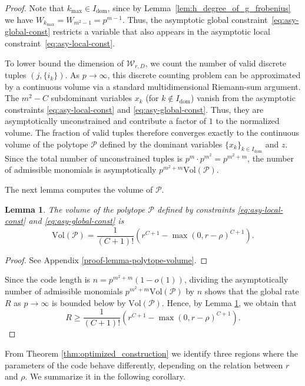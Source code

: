 \documentclass[11pt]{article}
\theoremstyle{plain}
\newtheorem{lemma}[theorem]{Lemma}
\theoremstyle{definition}
\begin{document}
\begin{proof}
Note that $k_{\max}\in I_{\mathrm{dom}}$, since by Lemma~\ref{lem:h_degree_of_g_frobenius} we have
$W_{k_{\max}}=W_{m^2-1}=p^{m-1}$.
Thus, the asymptotic global constraint~\eqref{eq:asy-global-const} restricts a variable that also appears in the asymptotic local constraint~\eqref{eq:asy-local-const}.



To lower bound the dimension of $\mathcal{W}_{r,D}$, we count the number of valid discrete tuples $(j, \{i_k\})$. As $p \to \infty$, this discrete counting problem can be approximated by a continuous volume via a standard multidimensional Riemann-sum argument.
The $m^2-C$ subdominant variables $x_k$ (for $k \notin I_{\mathrm{dom}}$) vanish from the asymptotic constraints \eqref{eq:asy-local-const} and \eqref{eq:asy-global-const}. Thus, they are asymptotically unconstrained and contribute a factor of $1$ to the normalized volume.
The fraction of valid tuples therefore converges exactly to the continuous volume of the polytope $\mathcal{P}$ defined by the dominant variables $\{x_k\}_{k\in I_{\mathrm{dom}}}$ and $z$.
Since the total number of unconstrained tuples is $p^m \cdot p^{m^2} = p^{m^2+m}$, the number of admissible monomials is asymptotically $p^{m^2+m} \mathrm{Vol}(\mathcal{P})$.
 
The next lemma computes the volume of $\mathcal{P}$.

\begin{lemma}
\label{lem:polytope_volume}
The volume of the polytope $\mathcal{P}$ defined by constraints \eqref{eq:asy-local-const} and \eqref{eq:asy-global-const} is
$$ \text{Vol}(\mathcal{P}) = \frac{1}{(C+1)!} \left(r^{C+1} - \max(0, r-\rho)^{C+1}\right). $$
\end{lemma}

\begin{proof}
    See Appendix \ref{proof-lemma-polytope-volume}.
\end{proof}
Since the code length is $n = p^{m^2+m}(1-o(1))$, dividing the asymptotically number of admissible monomials  $p^{m^2+m}\mathrm{Vol}(\mathcal{P})$ by $n$ shows that the global rate $R$ as $p \to \infty$ is bounded below by $\mathrm{Vol}(\mathcal{P})$. Hence, by Lemma \ref{lem:polytope_volume}, we obtain that
\[
R \ge \frac{1}{(C+1)!} \left(r^{C+1} - \max(0, r-\rho)^{C+1}\right). 
\]
\end{proof}

From Theorem \ref{thm:optimized_construction} we identify three regions where the parameters of the code behave differently, depending on the relation between $r$ and $\rho$. We summarize it in the following corollary. 
\end{document}
